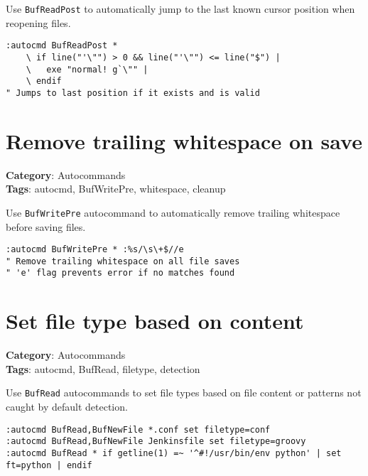 Use {\footnotesize \Verb§BufReadPost§} to automatically jump to the last known cursor position when reopening files.

\begin{Exa*}{}
\begin{Verbatim}[fontsize=\footnotesize, breaklines, breakanywhere]
:autocmd BufReadPost * 
    \ if line("'\"") > 0 && line("'\"") <= line("$") |
    \   exe "normal! g`\"" |
    \ endif
" Jumps to last position if it exists and is valid
\end{Verbatim}
\end{Exa*}

\section{Remove trailing whitespace on save}

\textbf{Category}: Autocommands\\ \textbf{Tags}: autocmd, BufWritePre, whitespace, cleanup
\vspace{0.5cm}

Use {\footnotesize \Verb§BufWritePre§} autocommand to automatically remove trailing whitespace before saving files.

\begin{Exa*}{}
\begin{Verbatim}[fontsize=\footnotesize, breaklines, breakanywhere]
:autocmd BufWritePre * :%s/\s\+$//e
" Remove trailing whitespace on all file saves
" 'e' flag prevents error if no matches found
\end{Verbatim}
\end{Exa*}

\section{Set file type based on content}

\textbf{Category}: Autocommands\\ \textbf{Tags}: autocmd, BufRead, filetype, detection
\vspace{0.5cm}

Use {\footnotesize \Verb§BufRead§} autocommands to set file types based on file content or patterns not caught by default detection.

\begin{Exa*}{}
\begin{Verbatim}[fontsize=\footnotesize, breaklines, breakanywhere]
:autocmd BufRead,BufNewFile *.conf set filetype=conf
:autocmd BufRead,BufNewFile Jenkinsfile set filetype=groovy  
:autocmd BufRead * if getline(1) =~ '^#!/usr/bin/env python' | set ft=python | endif
\end{Verbatim}
\end{Exa*}

